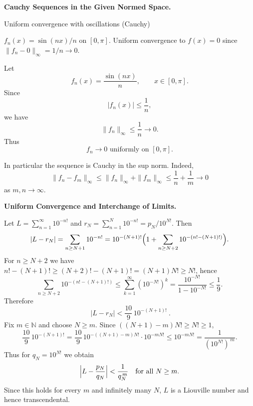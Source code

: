 \begin{problem}[CP-II-0442]
\label{prob:cp-ii-0442}
\textbf{Cauchy Sequences in the Given Normed Space.}

\hspace*{1.5em}Uniform convergence with oscillations (Cauchy)

$f_n(x)=\sin(nx)/n$ on $[0,\pi]$.
Uniform convergence to $f(x)=0$ since $\|f_n-0\|_\infty=1/n \to 0$.
\end{problem}

\begin{solution}
Let
\[
f_n(x)=\frac{\sin(nx)}{n},
\qquad
x\in[0,\pi].
\]
Since
\[
|f_n(x)|\le\frac1n,
\]
we have
\[
\|f_n\|_\infty\le\frac1n\to0.
\]
Thus
\[
\boxed{
f_n\to0
\text{ uniformly on }[0,\pi].
}
\]

In particular the sequence is Cauchy in the sup norm. Indeed,
\[
\|f_n-f_m\|_\infty
\le
\|f_n\|_\infty+\|f_m\|_\infty
\le
\frac1n+\frac1m
\longrightarrow0
\]
as \(m,n\to\infty\).
\end{solution}


\begin{problem}[CP-II-0444]
\label{prob:cp-ii-0444}
\textbf{Uniform Convergence and Interchange of Limits.}

\hspace*{1.5em}Let $L=\sum_{n=1}^\infty 10^{-n!}$ and $r_N=\sum_{n=1}^{N}10^{-n!}=p_N/10^{N!}$.
	Then
	\[
	|L-r_N|=\sum_{n\ge N+1}10^{-n!}
	=10^{-(N+1)!}\Bigl(1+\sum_{n\ge N+2}10^{-(n!-(N+1)!)}\Bigr).
	\]
	For $n\ge N+2$ we have $n!-(N+1)!\ge (N+2)!-(N+1)!=(N+1)N!\ge N!$, hence
	\[
	\sum_{n\ge N+2}10^{-(n!-(N+1)!)}\le \sum_{k=1}^\infty (10^{-N!})^{k}
	=\frac{10^{-N!}}{1-10^{-N!}}\le \frac{1}{9}.
	\]
	Therefore
	\[
	\boxed{\ |L-r_N|< \frac{10}{9}\,10^{-(N+1)!}\ }.
	\]
	Fix $m\in\mathbb N$ and choose $N\ge m$. Since $((N+1)-m)N!\ge N!\ge1$,
	\[
	\frac{10}{9}\,10^{-(N+1)!}
	=\frac{10}{9}\,10^{-((N+1)-m)N!}\cdot 10^{-mN!}\le 10^{-mN!}
	=\frac{1}{(10^{N!})^{\,m}}.
	\]
	Thus for $q_N=10^{N!}$ we obtain
	\[
	\Bigl|L-\frac{p_N}{q_N}\Bigr|<\frac{1}{q_N^{\,m}}
	\quad\text{for all }N\ge m.
	\]
	Since this holds for every $m$ and infinitely many $N$, $L$ is a Liouville number and hence transcendental.
\end{problem}


